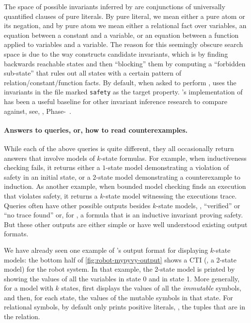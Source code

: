 The space of possible invariants inferred by \updr are
  conjunctions of universally quantified clauses of pure literals.
By pure literal, we mean either a pure atom or its negation,
  and by pure atom we mean either a relational fact over variables,
  an equation between a constant and a variable,
  or an equation between a function applied to variables and a variable.
The reason for this seemingly obscure search space is
  due to the way \updr constructs candidate invariants,
  which is by finding backwards reachable states and then ``blocking'' them
  by computing a ``forbidden sub-state'' that
  rules out all states with a certain pattern of relation/constant/function facts.
By default, when asked to perform \updr,
  \mypyvy uses the invariants in the file marked \lstinline[language=mypyvy]{safety}
  as the target property.
\mypyvy's implementation of \updr has been a useful baseline
  for other invariant inference research to compare against,
  see, \eg, Phase-\updr~\cite{phase-updr}.

\paragraph{Answers to queries, or, how to read counterexamples.}
While each of the above queries is quite different,
  they all occasionally return answers
  that involve models of $k$-state formulas.
For example, when inductiveness checking fails,
  it returns either
    a $1$-state model demonstrating a violation of safety in an initial state,
    or a $2$-state model demonstrating a counterexample to induction.
As another example,
  when bounded model checking finds an execution that violates safety,
    it returns a $k$-state model witnessing the executions trace.
Queries often have other possible outputs besides $k$-state models,
  \eg, ``verified'' or ``no trace found'' or,
  for \updr, a formula that is an inductive invariant proving safety.
But these other outputs are either simple
  or have well understood existing output formats.

We have already seen one example
  of \mypyvy's output format for displaying $k$-state models:
  the bottom half of \cref{fig:robot-mypyvy-output}
  shows a CTI (\ie, a 2-state model) for the robot system.
In that example, the 2-state model is printed
  by showing the values of all the variables
  in state 0 and in state 1.
More generally, for a model with $k$ states,
  \mypyvy first displays the values of all the \emph{immutable} symbols,
  and then, for each state, the values of the mutable symbols in that state.
For relational symbols,
  by default \mypyvy only prints positive literals,
  \ie, the tuples that are in the relation.


